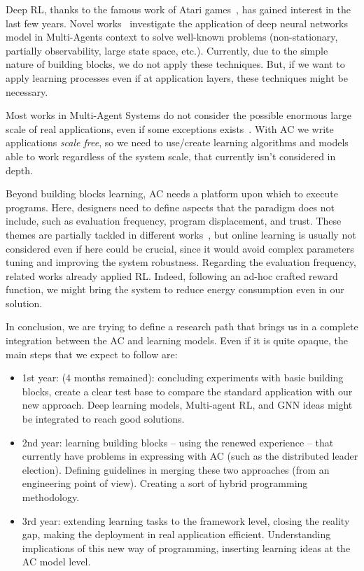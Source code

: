 \documentclass[conference]{IEEEtran}
\begin{document}
Deep RL, thanks to the famous work of Atari games~\cite{DBLP:journals/corr/HosuR16}, has gained interest in the last few years. Novel works~\cite{DBLP:journals/aamas/Hernandez-LealK19} investigate the application of deep neural networks model in Multi-Agents context
to solve well-known problems (non-stationary, partially observability, large state space, etc.). Currently, due to the simple nature of building blocks, we do not apply these techniques. But, if we want to apply learning processes even if
at application layers, these techniques might be necessary.

Most works in Multi-Agent Systems do not consider the possible enormous large scale of real applications, even if some exceptions exists~\cite{nguyen2018reinforcement}. With AC we write applications \emph{scale free}, so we need to use/create learning algorithms and models able to work
regardless of the system scale, that currently isn't considered in depth.

Beyond building blocks learning, AC needs a platform upon which to execute programs. 
Here, designers need to define aspects that the paradigm does not include, 
such as evaluation frequency, program displacement, and trust. 
These themes are partially tackled in different works~\cite{DBLP:journals/scp/CasadeiAV18, DBLP:journals/fi/CasadeiPPVW20, DBLP:journals/corr/abs-2012-13806}, 
but online learning is usually not considered even if here could be crucial, 
since it would avoid complex parameters tuning and improving the system robustness.
Regarding the evaluation frequency, related works already applied RL. 
Indeed, following an ad-hoc crafted reward function, we might bring the system to reduce energy consumption even in our solution.

In conclusion, we are trying to define a research path that brings us in a complete integration between the AC and learning models. Even if it is quite opaque, the main
steps that we expect to follow are:
\begin{itemize}
    \item 1st year: (4 months remained): concluding experiments with basic building blocks, create a clear test base to compare the standard application with our new approach. Deep learning models, Multi-agent RL, and GNN ideas might be integrated to reach good solutions.
    \item 2nd year: learning building blocks -- using the renewed experience -- that currently have problems in expressing with AC (such as the distributed leader election).
    Defining guidelines in merging these two approaches (from an engineering point of view). Creating a sort of hybrid programming methodology.
    \item 3rd year: extending learning tasks to the framework level, closing the reality gap, making the deployment in real application efficient. Understanding implications of this new way of programming, inserting learning ideas at the AC model level. 
\end{itemize}



\end{document}

